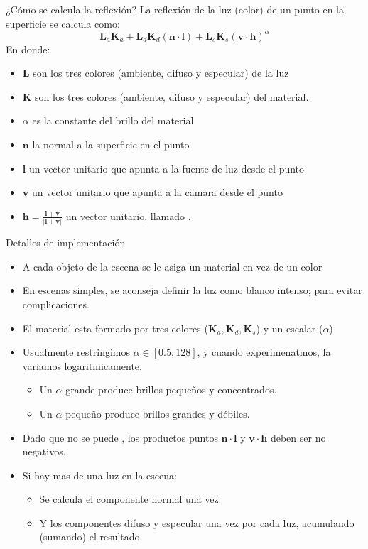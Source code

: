 \begin{frame}{¿Cómo se calcula la reflexión?}
La reflexión de la luz (color) de un punto en la superficie se calcula como:
 $$\mathbf{L}_a \mathbf{K}_a + \mathbf{L}_d \mathbf{K}_d (\mathbf{n} \cdot \mathbf{l}) + \mathbf{L}_s \mathbf{K}_s (\mathbf{v} \cdot \mathbf{h})^{\alpha}$$
 En donde:
 \begin{itemize}
  \item $\mathbf{L}$ son los tres colores (ambiente, difuso y especular) de la luz 
  \item $\mathbf{K}$ son los tres colores (ambiente, difuso y especular) del material.
  \item $\alpha$ es la constante del brillo del material
  \item $\mathbf{n}$ la normal a la superficie en el punto
  \item $\mathbf{l}$ un vector unitario que apunta a la fuente de luz desde el punto
  \item $\mathbf{v}$ un vector unitario que apunta a la camara desde el punto
  \item $\mathbf{h} = \frac{\mathbf{l} + \mathbf{v}}{|\mathbf{l} + \mathbf{v}|}$ un vector unitario, llamado .
 \end{itemize}
\end{frame}


\begin{frame}{Detalles de implementación}
\begin{itemize}
  \item A cada objeto de la escena se le asiga un material en vez de un color
  \item En escenas simples, se aconseja definir la luz como blanco intenso; para evitar complicaciones.
   \item El material esta formado por tres colores ($\mathbf{K}_a, \mathbf{K}_d, \mathbf{K}_s$) y un escalar ($\alpha$)
   \item Usualmente restringimos $\alpha \in [ 0.5, 128 ]$, y cuando experimenatmos, la variamos logaritmicamente.
  \begin{itemize}
   \item Un $\alpha$ grande produce brillos pequeños y concentrados.
   \item Un $\alpha$ pequeño produce brillos grandes y débiles.
  \end{itemize}
  \item Dado que no se puede , los productos puntos $\mathbf{n} \cdot \mathbf{l}$ y $\mathbf{v} \cdot \mathbf{h}$ deben ser no negativos.
  \item Si hay mas de una luz en la escena:
  \begin{itemize}
   \item Se calcula el componente normal una vez.
   \item Y los componentes difuso y especular una vez por cada luz, acumulando (sumando) el resultado
  \end{itemize}
\end{itemize}
\end{frame}

